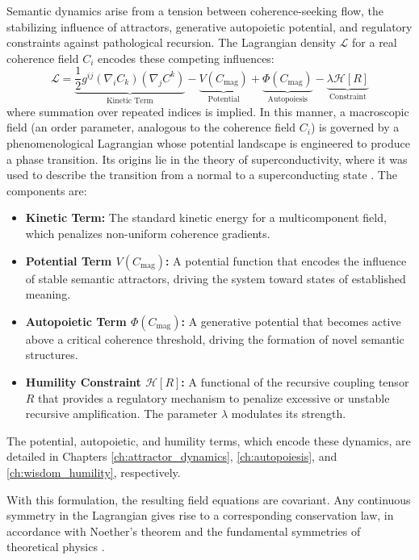 Semantic dynamics arise from a tension between coherence-seeking flow, the stabilizing influence of attractors, generative autopoietic potential, and regulatory constraints against pathological recursion. The Lagrangian density \(\mathcal{L}\) for a real coherence field \(C_i\) encodes these competing influences:
\begin{equation}
\mathcal{L} = \underbrace{\frac{1}{2} g^{ij} (\nabla_i C_k)(\nabla_j C^k)}_{\text{Kinetic Term}} - \underbrace{V(C_{\text{mag}})}_{\text{Potential}} + \underbrace{\Phi(C_{\text{mag}})}_{\text{Autopoiesis}} - \underbrace{\lambda \mathcal{H}[R]}_{\text{Constraint}}
\end{equation}
where summation over repeated indices is implied. In this manner, a macroscopic field (an order parameter, analogous to the coherence field \(C_i\)) is governed by a phenomenological Lagrangian whose potential landscape is engineered to produce a phase transition. Its origins lie in the theory of superconductivity, where it was used to describe the transition from a normal to a superconducting state \autocite{GinzburgLandau1950}. The components are:
\begin{itemize}
    \item \textbf{Kinetic Term:} The standard kinetic energy for a multicomponent field, which penalizes non-uniform coherence gradients.
    \item \textbf{Potential Term \(V(C_{\text{mag}})\):} A potential function that encodes the influence of stable semantic attractors, driving the system toward states of established meaning.
    \item \textbf{Autopoietic Term \(\Phi(C_{\text{mag}})\):} A generative potential that becomes active above a critical coherence threshold, driving the formation of novel semantic structures.
    \item \textbf{Humility Constraint \(\mathcal{H}[R]\):} A functional of the recursive coupling tensor \(R\) that provides a regulatory mechanism to penalize excessive or unstable recursive amplification. The parameter \(\lambda\) modulates its strength.
\end{itemize}
The potential, autopoietic, and humility terms, which encode these dynamics, are detailed in Chapters \ref{ch:attractor_dynamics}, \ref{ch:autopoiesis}, and \ref{ch:wisdom_humility}, respectively.

With this formulation, the resulting field equations are covariant. Any continuous symmetry in the Lagrangian gives rise to a corresponding conservation law, in accordance with Noether's theorem and the fundamental symmetries of theoretical physics \autocite{Noether1918, Lagrange1788, Euler1744, LandauLifshitz1975, PeskinSchroeder1995, Weinberg1995}.


